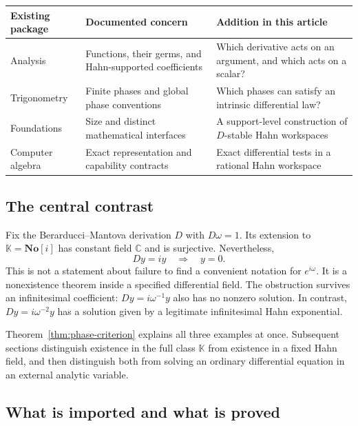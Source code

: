 \documentclass[11pt,a4paper]{article}
\numberwithin{equation}{section}
\theoremstyle{definition}
\theoremstyle{remark}
\newcommand{\No}{\mathbf{No}}
\newcommand{\K}{\mathbb K}
\newcommand{\C}{\mathbb C}
\begin{document}
\begin{center}
\small
\begin{tabular}{@{}p{}p{}p{}@{}}
\toprule
Existing package & Documented concern & Addition in this article\\
\midrule
Analysis & Functions, their germs, and Hahn-supported coefficients & Which derivative acts on an argument, and which acts on a scalar?\\[3pt]
Trigonometry & Finite phases and global phase conventions & Which phases can satisfy an intrinsic differential law?\\[3pt]
Foundations & Size and distinct mathematical interfaces & A support-level construction of $D$-stable Hahn workspaces\\[3pt]
Computer algebra & Exact representation and capability contracts & Exact differential tests in a rational Hahn workspace\\
\bottomrule
\end{tabular}
\end{center}

\subsection{The central contrast}

Fix the Berarducci--Mantova derivation $D$ with $D\omega=1$. Its extension to
$\K=\No[i]$ has constant field $\C$ and is surjective. Nevertheless,
\begin{equation}\label{eq:first-surprise}
 Dy=iy \quad\Longrightarrow\quad y=0.
\end{equation}
This is not a statement about failure to find a convenient notation for
$e^{i\omega}$. It is a nonexistence theorem inside a specified differential
field. The obstruction survives an infinitesimal coefficient:
$Dy=i\omega^{-1}y$ also has no nonzero solution. In contrast,
$Dy=i\omega^{-2}y$ has a solution given by a legitimate infinitesimal Hahn
exponential.

Theorem~\ref{thm:phase-criterion} explains all three examples at once.
Subsequent sections distinguish existence in the full class $\K$ from
existence in a fixed Hahn field, and then distinguish both from solving an
ordinary differential equation in an external analytic variable.

\subsection{What is imported and what is proved}
\end{document}
